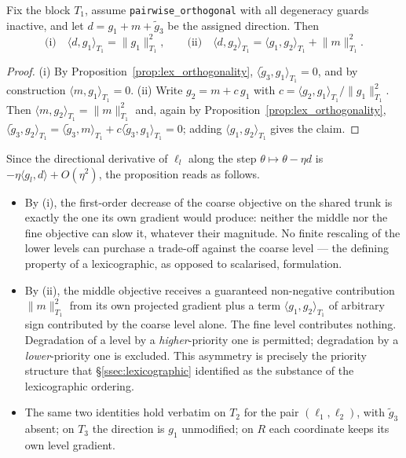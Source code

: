 \begin{proposition}
\label{prop:lex_firstorder}
Fix the block $T_1$, assume \texttt{pairwise\_orthogonal} with all degeneracy guards inactive,
and let $d=g_1+m+\tilde g_3$ be the assigned direction. Then
\[
\text{(i)}\quad \langle d, g_1\rangle_{T_1}=\lVert g_1\rVert^2_{T_1},
\qquad
\text{(ii)}\quad \langle d, g_2\rangle_{T_1}=\langle g_1,g_2\rangle_{T_1}+\lVert m\rVert^2_{T_1}.
\]
\end{proposition}
\begin{proof}
(i) By Proposition~\ref{prop:lex_orthogonality}, $\langle \tilde g_3,g_1\rangle_{T_1}=0$, and by
construction $\langle m,g_1\rangle_{T_1}=0$. (ii) Write $g_2=m+c\,g_1$ with
$c=\langle g_2,g_1\rangle_{T_1}/\lVert g_1\rVert^2_{T_1}$. Then
$\langle m,g_2\rangle_{T_1}=\lVert m\rVert^2_{T_1}$ and, again by
Proposition~\ref{prop:lex_orthogonality},
$\langle \tilde g_3,g_2\rangle_{T_1}=\langle \tilde g_3,m\rangle_{T_1}+c\langle \tilde
g_3,g_1\rangle_{T_1}=0$; adding $\langle g_1,g_2\rangle_{T_1}$ gives the claim.
\end{proof}

Since the directional derivative of $\ell_l$ along the step $\theta\mapsto\theta-\eta d$ is
$-\eta\langle g_l,d\rangle+O(\eta^2)$, the proposition reads as follows.

\begin{itemize}
    \item By (i), the first-order decrease of the coarse objective on the shared trunk is exactly
    the one its own gradient would produce: neither the middle nor the fine objective can slow it,
    whatever their magnitude. No finite rescaling of the lower levels can purchase a trade-off
    against the coarse level --- the defining property of a lexicographic, as opposed to
    scalarised, formulation.
    \item By (ii), the middle objective receives a guaranteed non-negative contribution
    $\lVert m\rVert^2_{T_1}$ from its own projected gradient plus a term
    $\langle g_1,g_2\rangle_{T_1}$ of arbitrary sign contributed by the coarse level alone. The
    fine level contributes nothing. Degradation of a level by a \emph{higher}-priority one is
    permitted; degradation by a \emph{lower}-priority one is excluded. This asymmetry is precisely
    the priority structure that \S\ref{ssec:lexicographic} identified as the substance of the
    lexicographic ordering.
    \item The same two identities hold verbatim on $T_2$ for the pair $(\ell_1,\ell_2)$, with
    $\tilde g_3$ absent; on $T_3$ the direction is $g_1$ unmodified; on $R$ each coordinate keeps
    its own level gradient.
\end{itemize}

